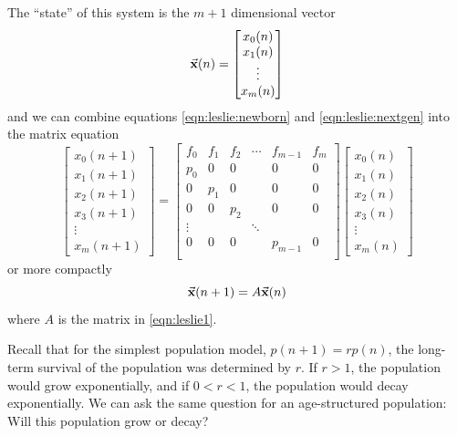 The ``state'' of this system is the $m+1$ dimensional
vector
\begin{equation}
  \vec{\textbf{x}}(n) = \begin{bmatrix} x_0(n) \\ x_1(n) \\ \vdots \\x_m(n)
           \end{bmatrix}
\end{equation}
and we can combine equations \eqref{eqn:leslie:newborn}
and \eqref{eqn:leslie:nextgen} into the matrix equation
\begin{equation}
   \begin{bmatrix}
      x_0(n+1) \\ x_1(n+1) \\ x_2(n+1) \\ x_3(n+1) \\ \vdots \\x_m(n+1)
   \end{bmatrix}
    =
   \begin{bmatrix}
      f_0 & f_1 &  f_2 & \cdots & f_{m-1} & f_m \\
      p_0 &  0  &   0  &        &  0      &  0  \\
       0  & p_1 &   0  &        &  0      &  0  \\
       0  &  0  &  p_2  &       &  0      &  0  \\
       \vdots & & & \ddots \\
       0 &  0  &   0  & & p_{m-1} & 0 \\
   \end{bmatrix}
   \begin{bmatrix}
       x_0(n) \\ x_1(n) \\ x_2(n) \\ x_3(n) \\ \vdots \\x_m(n)
   \end{bmatrix}
\label{eqn:leslie1}
\end{equation}
or more compactly
\begin{equation}
   \vec{\textbf{x}}(n+1) = A\vec{\textbf{x}}(n)
\end{equation}
where $A$ is the matrix in \eqref{eqn:leslie1}.

Recall that for the simplest population model, $p(n+1) = rp(n)$,
the long-term survival of the population was determined 
by $r$. If $r > 1$, the population would grow exponentially,
and if $0 < r < 1$, the population would decay exponentially.
We can ask the same question for an age-structured population:
Will this population grow or decay?

